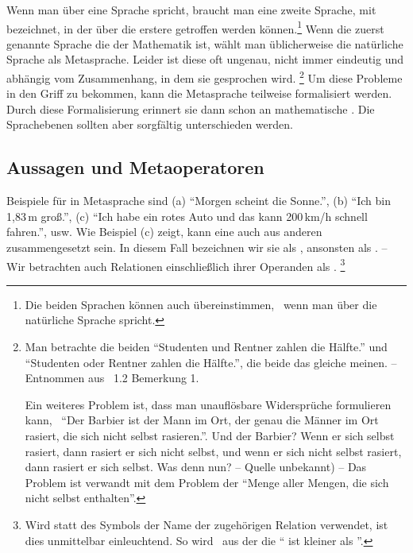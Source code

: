 Wenn man über eine Sprache spricht, braucht man eine zweite Sprache, mit \emph{} bezeichnet, in der  über die erstere getroffen werden können.\footnote{%
	Die beiden Sprachen können auch übereinstimmen, \textzB\ wenn man über die natürliche Sprache spricht.
}
Wenn die zuerst genannte Sprache die der Mathematik ist, wählt man üblicherweise die natürliche Sprache als Metasprache.
Leider ist diese oft ungenau, nicht immer eindeutig und abhängig vom Zusammenhang, in dem sie gesprochen wird.%
\footnote{%
	Man betrachte die beiden  \enquote{Studenten und Rentner zahlen die Hälfte.} und \enquote{Studenten oder Rentner zahlen die Hälfte.}, die beide das gleiche meinen.
	-- Entnommen aus \cite{bib:Rautenberg} \sectionname~1.2 Bemerkung 1.

	Ein weiteres Problem ist, dass man unauflösbare Widersprüche formulieren kann, \textzB\ \enquote{Der Barbier ist der Mann im Ort, der genau die Männer im Ort rasiert, die sich nicht selbst rasieren.}.
	Und der Barbier?
	Wenn er sich selbst rasiert, dann rasiert er sich nicht selbst, und wenn er sich nicht selbst rasiert, dann rasiert er sich selbst.
	Was denn nun?
	-- Quelle unbekannt) --
	Das Problem ist verwandt mit dem Problem der \enquote{Menge aller Mengen, die sich nicht selbst enthalten}.%
}
Um diese Probleme in den Griff zu bekommen, kann die Metasprache teilweise formalisiert werden.
Durch diese Formalisierung erinnert sie dann schon an mathematische .
Die Sprachebenen sollten aber sorgfältig unterschieden werden.

\subsection{Aussagen und Metaoperatoren}%
\label{sub:Aussagen}

Beispiele für  in Metasprache sind
(a) \enquote{Morgen scheint die Sonne.},
(b) \enquote{Ich bin 1,83\,m groß.},
(c) \enquote{Ich habe ein rotes Auto und das kann 200\,km/h schnell fahren.}, usw.
Wie Beispiel (c) zeigt, kann eine  auch aus anderen  zusammengesetzt sein.
In diesem Fall bezeichnen wir sie als \emph{}, ansonsten als \emph{}.
-- Wir betrachten auch Relationen einschließlich ihrer Operanden als .%
\footnote{%
	Wird statt des Symbols der Name der zugehörigen Relation verwendet, ist dies unmittelbar einleuchtend.
	So wird \textzB\ aus der   die  \enquote{ ist kleiner als }.%
}


